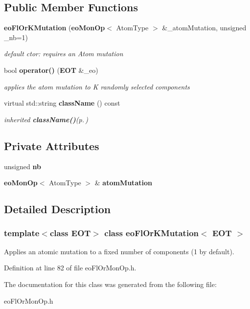 \subsection*{Public Member Functions}
\begin{CompactItemize}
\item 
{\bf eo\-Fl\-Or\-KMutation} ({\bf eo\-Mon\-Op}$<$ Atom\-Type $>$ \&\_\-atom\-Mutation, unsigned \_\-nb=1)\label{classeo_fl_or_k_mutation_a0}

\begin{CompactList}\small\item\em default ctor: requires an Atom mutation \item\end{CompactList}\item 
bool {\bf operator()} ({\bf EOT} \&\_\-eo)\label{classeo_fl_or_k_mutation_a1}

\begin{CompactList}\small\item\em applies the atom mutation to K randomly selected components \item\end{CompactList}\item 
virtual std::string {\bf class\-Name} () const \label{classeo_fl_or_k_mutation_a2}

\begin{CompactList}\small\item\em inherited {\bf class\-Name()}{\rm (p.\,\pageref{classeo_fl_or_k_mutation_a2})} \item\end{CompactList}\end{CompactItemize}
\subsection*{Private Attributes}
\begin{CompactItemize}
\item 
unsigned {\bf nb}\label{classeo_fl_or_k_mutation_r0}

\item 
{\bf eo\-Mon\-Op}$<$ Atom\-Type $>$ \& {\bf atom\-Mutation}\label{classeo_fl_or_k_mutation_r1}

\end{CompactItemize}


\subsection{Detailed Description}
\subsubsection*{template$<$class EOT$>$ class eo\-Fl\-Or\-KMutation$<$ EOT $>$}

Applies an atomic mutation to a fixed number of components (1 by default). 



Definition at line 82 of file eo\-Fl\-Or\-Mon\-Op.h.

The documentation for this class was generated from the following file:\begin{CompactItemize}
\item 
eo\-Fl\-Or\-Mon\-Op.h\end{CompactItemize}
